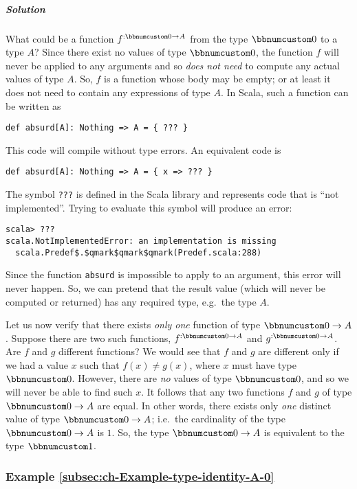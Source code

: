 \subparagraph{Solution}

What could be a function $f^{:\bbnum 0\rightarrow A}$ from the type
$\bbnum 0$ to a type $A$? Since there exist no values of type $\bbnum 0$,
the function $f$ will never be applied to any arguments and so \emph{does
not need} to compute any actual values of type $A$. So, $f$ is a
function whose body may be empty; or at least it does not need to
contain any expressions of type $A$. In Scala, such a function can
be written as
\begin{lstlisting}
def absurd[A]: Nothing => A = { ??? }
\end{lstlisting}
This code will compile without type errors. An equivalent code is
\begin{lstlisting}
def absurd[A]: Nothing => A = { x => ??? }
\end{lstlisting}
The symbol \lstinline!???! is defined in the Scala library and represents
code that is ``not implemented''. Trying to evaluate this symbol
will produce an error:
\begin{lstlisting}
scala> ???
scala.NotImplementedError: an implementation is missing
  scala.Predef$.$qmark$qmark$qmark(Predef.scala:288) 
\end{lstlisting}
Since the function \lstinline!absurd! is impossible to apply to an
argument, this error will never happen. So, we can pretend that the
result value (which will never be computed or returned) has any required
type, e.g.~the type $A$.

Let us now verify that there exists \emph{only one} function of type
$\bbnum 0\rightarrow A$. Suppose there are two such functions, $f^{:\bbnum 0\rightarrow A}$
and $g^{:\bbnum 0\rightarrow A}$. Are $f$ and $g$ different functions?
We would see that $f$ and $g$ are different only if we had a value
$x$ such that $f(x)\neq g(x)$, where $x$ must have type $\bbnum 0$.
However, there are \emph{no} values of type $\bbnum 0$, and so we
will never be able to find such $x$. It follows that any two functions
$f$ and $g$ of type $\bbnum 0\rightarrow A$ are equal. In other
words, there exists only \emph{one} distinct value of type $\bbnum 0\rightarrow A$;
i.e.~the cardinality of the type $\bbnum 0\rightarrow A$ is $1$.
So, the type $\bbnum 0\rightarrow A$ is equivalent to the type $\bbnum 1$.

\subsubsection{Example \label{subsec:ch-Example-type-identity-A-0}\ref{subsec:ch-Example-type-identity-A-0}}

